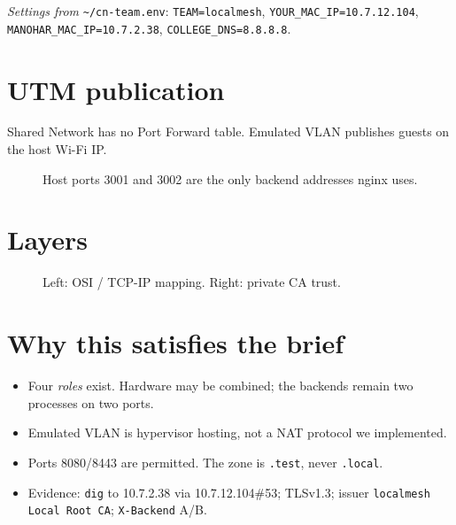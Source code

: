 \documentclass[11pt,a4paper]{article}
\begin{document}
\vspace{7pt}
\noindent\textit{Settings from} \texttt{\textasciitilde/cn-team.env}:
\texttt{TEAM=localmesh},
\texttt{YOUR\_MAC\_IP=10.7.12.104},
\texttt{MANOHAR\_MAC\_IP=10.7.2.38},
\texttt{COLLEGE\_DNS=8.8.8.8}.

\section{UTM publication}
Shared Network has no Port Forward table. Emulated VLAN publishes guests on the host Wi-Fi IP.

\begin{figure}[H]
\centering
\drawUtm
\caption{Host ports 3001 and 3002 are the only backend addresses nginx uses.}
\end{figure}

\section{Layers}
\begin{figure}[H]
\begin{minipage}[t]{0.54\textwidth}
\drawOsi
\end{minipage}
\hfill
\begin{minipage}[t]{0.44\textwidth}
\drawTls
\end{minipage}
\caption{Left: OSI / TCP-IP mapping. Right: private CA trust.}
\end{figure}

\section{Why this satisfies the brief}
\begin{itemize}[leftmargin=1.15em,itemsep=2pt]
  \item Four \emph{roles} exist. Hardware may be combined; the backends remain two processes on two ports.
  \item Emulated VLAN is hypervisor hosting, not a NAT protocol we implemented.
  \item Ports 8080/8443 are permitted. The zone is \texttt{.test}, never \texttt{.local}.
  \item Evidence: \texttt{dig} to 10.7.2.38 via 10.7.12.104\#53; TLSv1.3; issuer \texttt{localmesh Local Root CA}; \texttt{X-Backend} A/B.
\end{itemize}
\end{document}
